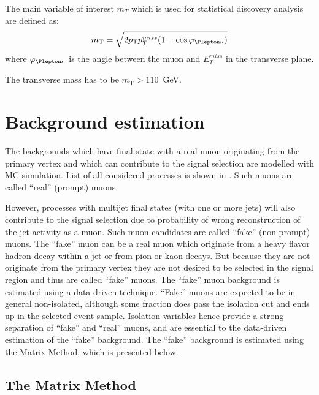 
The main variable of interest $m_T$ which is used for statistical discovery analysis are defined as:
\begin{equation}
 m_\mathrm{T} = \sqrt{2 p_\mathrm{T} p_T^{miss} (1-\cos\varphi_{\Plepton\nu})}
\end{equation}
where $\varphi_{\Plepton\nu}$ is the angle between the muon and $E_T^{miss}$ in the transverse plane.

The transverse mass has to be $m_\mathrm{T} > 110$~GeV.


\section{Background estimation}
\label{sec:wprime_backgroundEstimation}

The backgrounds which have final state with a real muon originating from the primary vertex and 
which can contribute to the signal selection are modelled with MC simulation.
List of all considered processes is shown in .
Such muons are called ``real'' (prompt) muons.

However, processes with multijet final states (with one or more jets) will also contribute to
the signal selection due to probability of wrong reconstruction of the jet activity as a muon.
Such muon candidates are called ``fake'' (non-prompt) muons.
The ``fake'' muon can be a real muon which originate from a heavy flavor hadron decay within a jet
or from pion or kaon decays. But because they are not originate from the primary vertex they are not
desired to be selected in the signal region and thus are called ``fake'' muons.
The ``fake'' muon background is estimated using a data driven technique. 
``Fake'' muons are expected to be in general non-isolated, although some
fraction does pass the isolation cut and ends up in the selected event sample. Isolation variables
hence provide a strong separation of ``fake'' and ``real'' muons, and are essential to the data-driven
estimation of the ``fake'' background.
The ``fake'' background is estimated using the Matrix Method, which is presented below.

\subsection{The Matrix Method}
\label{subsec:matrix_method}

